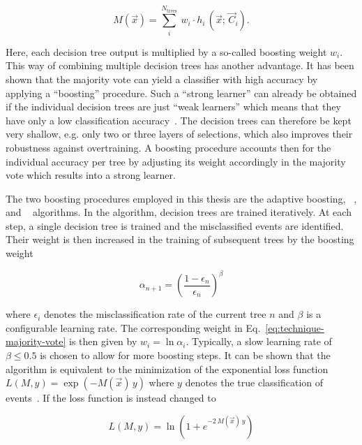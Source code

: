 \begin{equation}
M(\vec{x})=\sum_{i}^{N_\mathrm{trees}}~w_{i}\cdot h_{i}\,(\vec{x};\,\vec{C}_{i}).\label{eq:technique-majority-vote}
\end{equation}

Here, each decision tree output is multiplied by a so-called boosting weight $w_{i}$. This way of combining multiple decision trees has another advantage. It has been shown that the majority vote can yield a classifier with high accuracy by applying a ``boosting'' procedure. Such a ``strong learner'' can already be obtained if the individual decision trees are just ``weak learners'' which means that they have only a low classification accuracy~\cite{Schapire1990,FREUND1995256}. The decision trees can therefore be kept very shallow, e.g. only two or three layers of selections, which also improves their robustness against overtraining. A boosting procedure accounts then for the individual accuracy per tree by adjusting its weight accordingly in the majority vote which results into a strong learner.

The two boosting procedures employed in this thesis are the adaptive boosting, \ADABOOST~\cite{FREUND1997119}, and \GRADIENTBOOST~\cite{Friedman00greedyfunction} algorithms. In the \ADABOOST algorithm, decision trees are trained iteratively. At each step, a single decision tree is trained and the misclassified events are identified. Their weight is then increased in the training of subsequent trees by the boosting weight

\begin{equation}
\alpha_{n+1}=\left(\frac{1-\epsilon_{n}}{\epsilon_{n}}\right)^\beta
\end{equation}

where $\epsilon_{i}$ denotes the misclassification rate of the current tree $n$ and $\beta$ is a configurable learning rate. The corresponding weight in Eq.~\ref{eq:technique-majority-vote} is then given by $w_{i}=\ln\alpha_{i}$. Typically, a slow learning rate of $\beta\leq0.5$ is chosen to allow for more boosting steps. It can be shown that the \ADABOOST algorithm is equivalent to the minimization of the exponential loss function $L(M,y)=\exp(-M(\vec{x})\,y)$ where $y$ denotes the true classification of events~\cite{Hocker:2007ht}. If the loss function is instead changed to 

\begin{equation}
L(M,y)=\ln\left(1+e^{-2\,M(\vec{x})\,y}\right)
\end{equation}

